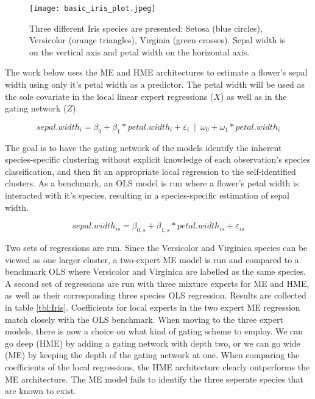 \documentclass[12pt]{article}
\begin{document}
\begin{figure}[!ht]
  \texttt{[image: basic\_iris\_plot.jpeg]}
  \caption{Three different Iris species are presented: Setosa
  (blue circles), Versicolor (orange triangles), Virginia (green crosses).
  Sepal width is on the vertical axis and petal width on the horizontal
  axis.}
  \label{fig:Iris_dataset}
\end{figure}

The work below uses the ME and HME architectures to estimate a flower's sepal
width using only it's petal width as a predictor. The petal width will be used
as the sole covariate in the local linear expert regressions ($X$) as well as
in the gating network ($Z$). 

\begin{equation} \label{eq:HME_iris}
    sepal.width_{i} = \beta_{0} + \beta_{1} * petal.width_{i} + \varepsilon_{i} \enspace | \enspace \omega_{0} + \omega_{1} * petal.width_{i}
\end{equation}

The goal is to have the gating network of the 
models identify the inherent species-specific clustering without explicit
knowledge of each observation's species classification, and then fit an
appropriate local regression to the self-identified clusters. As a benchmark,
an OLS model is run where a flower's petal width is interacted with it's species,
resulting in a species-specific estimation of sepal width.

\begin{equation} \label{eq:OLS_iris}
    sepal.width_{is} = \beta_{0,s} + \beta_{1, s} * petal.width_{is} + \varepsilon_{is}
\end{equation}

Two sets of regressions are run. Since the Versicolor and Virginica species
can be viewed as one larger cluster, a two-expert ME model is run
and compared to a benchmark OLS where Versicolor and Virginica are labelled
as the same species. A second set of regressions are run with three mixture
experts for ME and HME, as well as their corresponding three species OLS
regression. Results are collected in table \ref{tbl:Iris}. Coefficients for
local experts in the two expert ME regression match closely with the OLS
benchmark. When moving to the three expert models, there is now a choice
on what kind of gating scheme to employ. We can go deep (HME) by adding 
a gating network with depth two, or we can go wide (ME) by keeping the
depth of the gating network at one. When comparing the coefficients of the
local regressions, the HME architecture clearly outperforms the ME
architecture. The ME model fails to identify the three seperate
species that are known to exist.  
\end{document}
